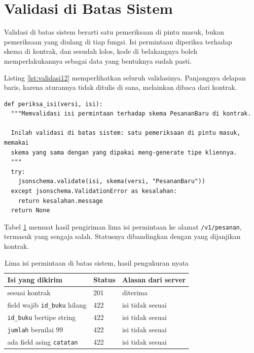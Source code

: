 \section{Validasi di Batas Sistem}

Validasi di batas sistem berarti satu pemeriksaan di pintu masuk, bukan
pemeriksaan yang diulang di tiap fungsi. Isi permintaan diperiksa terhadap
skema di kontrak, dan sesudah lolos, kode di belakangnya boleh
memperlakukannya sebagai data yang bentuknya sudah pasti.

Listing \ref{lst:validasi12} memperlihatkan seluruh validasinya. Panjangnya
delapan baris, karena aturannya tidak ditulis di sana, melainkan dibaca dari
kontrak.

\begin{lstlisting}[style=PythonStyle, caption={Validasi di batas sistem memakai skema dari kontrak, tersedia di \berkas{sources/chapter12/aplikasi.py}}, label={lst:validasi12}]
def periksa_isi(versi, isi):
  """Memvalidasi isi permintaan terhadap skema PesananBaru di kontrak.

  Inilah validasi di batas sistem: satu pemeriksaan di pintu masuk, memakai
  skema yang sama dengan yang dipakai meng-generate tipe kliennya.
  """
  try:
    jsonschema.validate(isi, skema(versi, "PesananBaru"))
  except jsonschema.ValidationError as kesalahan:
    return kesalahan.message
  return None
\end{lstlisting}

Tabel \ref{tab:validasi} memuat hasil pengiriman lima isi permintaan ke
alamat \texttt{/v1/pesanan}, termasuk yang sengaja salah. Statusnya
dibandingkan dengan yang dijanjikan kontrak.

\begin{table}[!htb]
  \centering
  \caption{Lima isi permintaan di batas sistem, hasil pengukuran nyata}
  \label{tab:validasi}
  \begin{tabularx}{\textwidth}{Xll}
    \hline
    \textbf{Isi yang dikirim} & \textbf{Status} & \textbf{Alasan dari server} \\
    \hline
    sesuai kontrak & 201 & diterima \\
    \hline
    field wajib \texttt{id\_buku} hilang & 422 & isi tidak sesuai \\
    \hline
    \texttt{id\_buku} bertipe string & 422 & isi tidak sesuai \\
    \hline
    \texttt{jumlah} bernilai 99 & 422 & isi tidak sesuai \\
    \hline
    ada field asing \texttt{catatan} & 422 & isi tidak sesuai \\
    \hline
  \end{tabularx}
\end{table}

